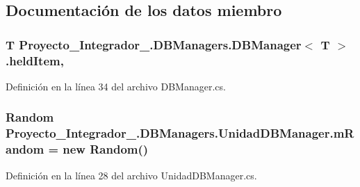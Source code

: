 \subsection{Documentación de los datos miembro}
\hypertarget{class_proyecto___integrador__3_1_1_d_b_managers_1_1_d_b_manager_3_01_t_01_4_a3b67ae3b5b3b9c3793d56c1407d7dcff}{
\subsubsection[{held\-Item}]{\setlength{\rightskip}{0pt plus 5cm}T Proyecto\-\_\-\-Integrador\-\_.\-D\-B\-Managers.\-D\-B\-Manager$<$ T $>$.held\-Item\hspace{0.3cm}{\ttfamily [protected]}, {\ttfamily [inherited]}}}\label{class_proyecto___integrador__3_1_1_d_b_managers_1_1_d_b_manager_3_01_t_01_4_a3b67ae3b5b3b9c3793d56c1407d7dcff}


Definición en la línea 34 del archivo D\-B\-Manager.\-cs.

\hypertarget{class_proyecto___integrador__3_1_1_d_b_managers_1_1_unidad_d_b_manager_a36c1b477b9264ffd517c6d2f736d76f4}{
\subsubsection[{m\-Random}]{\setlength{\rightskip}{0pt plus 5cm}Random Proyecto\-\_\-\-Integrador\-\_.\-D\-B\-Managers.\-Unidad\-D\-B\-Manager.\-m\-Random = new Random()\hspace{0.3cm}{\ttfamily [private]}}}\label{class_proyecto___integrador__3_1_1_d_b_managers_1_1_unidad_d_b_manager_a36c1b477b9264ffd517c6d2f736d76f4}


Definición en la línea 28 del archivo Unidad\-D\-B\-Manager.\-cs.

